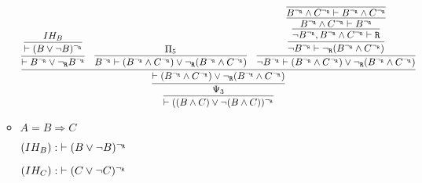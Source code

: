 \begin{enumerate}[(i)]
\begin{itemize}
            $$
            \infer{
                \vdash ((B \wedge C) \vee \neg(B \wedge C))^{\neg_\R}
            }{\infer{\Psi_3}{
                    \infer{\vdash (B^{\neg_\R} \wedge C^{\neg_\R}) \vee {\neg_\R}(B^{\neg_\R} \wedge C^{\neg_\R})
                }{
                        \infer{\vdash B^{\neg_\R} \vee {\neg_\R} B^{\neg_\R}
                    }{
                            \infer{\vdash (B \vee \neg B)^{\neg_\R}
                        }{
                            IH_B
                        }
                    }
                    &
                        \infer{B^{\neg_\R} \vdash (B^{\neg_\R} \wedge C^{\neg_\R}) \vee {\neg_\R}(B^{\neg_\R} \wedge C^{\neg_\R})
                    }{
                        \Pi_5
                    }
                    &
                    \infer{
                        \neg B^{\neg_\R} \vdash (B^{\neg_\R} \wedge C^{\neg_\R}) \vee {\neg_\R}(B^{\neg_\R} \wedge C^{\neg_\R})
                    }{
                        \infer{
                            \neg B^{\neg_\R} \vdash {\neg_\R}(B^{\neg_\R} \wedge C^{\neg_\R})
                        }{
                            \infer{
                                \neg B^{\neg_\R}, B^{\neg_\R} \wedge C^{\neg_\R} \vdash \R
                            }{
                                \infer{
                                    B^{\neg_\R} \wedge C^{\neg_\R} \vdash B^{\neg_\R}
                                }{
                                    \infer{
                                        B^{\neg_\R} \wedge C^{\neg_\R} \vdash B^{\neg_\R} \wedge C^{\neg_\R}
                                    }{
                                    }
                                }
                            }
                        }
                    }
                }
            }}
            $$
        \item $A = B \Rightarrow C$
        
            $(IH_B) : \; \vdash (B \vee \neg B)^{\neg_{\texttt{R}}}$
            
            $(IH_C) : \; \vdash (C \vee \neg C)^{\neg_{\texttt{R}}}$
            
            $$
            $$
    \end{itemize}


\end{enumerate}
